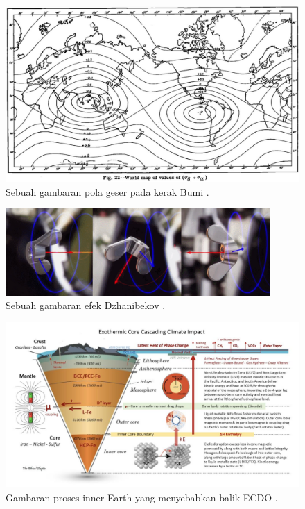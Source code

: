 \documentclass[10pt,twocolumn,letterpaper]{article}
\begin{document}
\begin{figure}[t]
\begin{center}
   \includegraphics[width=1\linewidth]{meinesz3.jpg}
\end{center}
   \caption{Sebuah gambaran pola geser pada kerak Bumi \cite{36}.}
\label{fig:8}
\label{fig:onecol}
\end{figure}

\begin{figure}[t]
\begin{center}
\includegraphics[width=0.9\textwidth]{dzhani.jpg}
\end{center}
   \caption{Sebuah gambaran efek Dzhanibekov \cite{28}.}
\label{fig:10}
\end{figure}

\begin{figure}[t]
\begin{center}
\includegraphics[width=1\textwidth]{layers.jpg}
\end{center}
   \caption{Gambaran proses inner Earth yang menyebabkan balik ECDO \cite{129}.}
\label{fig:11}
\end{figure}
\end{document}
